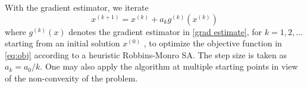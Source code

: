 \documentclass{wscpaperproc}
\theoremstyle{wsc}
\begin{document}






With the gradient estimator, we iterate\begin{equation}
x^{(k+1)}=x^{(k)}+a_kg^{(k)}(x^{(k)})
 \label{eq:sa}
\end{equation}
where $g^{(k)}(x)$ denotes the gradient estimator in \eqref{grad estimate}, for $k=1,2,\ldots$ starting from an initial solution $x^{(0)}$ , to optimize the objective function in \eqref{eq:obj} according to a heuristic Robbins-Monro SA. The step size is taken as $a_k=a_0/k$. One may also apply the algorithm at multiple starting points in view of the non-convexity of the problem. 
\end{document}
